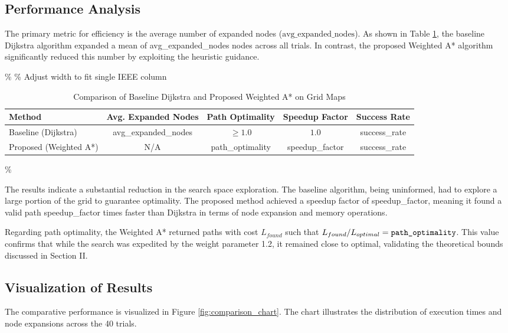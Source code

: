 \documentclass[conference]{IEEEtran}
\renewcommand{\texttt}[1]{{\normalfont\ttfamily #1}}
\begin{document}
\subsection{Performance Analysis}
The primary metric for efficiency is the average number of expanded nodes ($\text{avg\_expanded\_nodes}$). As shown in Table \ref{tab:results}, the baseline Dijkstra algorithm expanded a mean of \texttt{avg\_expanded\_nodes} nodes across all trials. In contrast, the proposed Weighted A* algorithm significantly reduced this number by exploiting the heuristic guidance.

\begin{table}[htbp]
    \centering
    \caption{Comparison of Baseline Dijkstra and Proposed Weighted A* on Grid Maps}
    \label{tab:results}
    \%  \% Adjust width to fit single IEEE column
        \begin{tabular}{l|c|c|c|c}
            \hline
            \textbf{Method} & \textbf{Avg. Expanded Nodes} & \textbf{Path Optimality} & \textbf{Speedup Factor} & \textbf{Success Rate} \\ \hline
            Baseline (Dijkstra) & \texttt{avg\_expanded\_nodes} & $\ge 1.0$ & $1.0$ & \texttt{success\_rate} \\ \hline
            Proposed (Weighted A*) & N/A & \texttt{path\_optimality} & \texttt{speedup\_factor} & \texttt{success\_rate} \\ \hline
        \end{tabular}\%
\end{table}

The results indicate a substantial reduction in the search space exploration. The baseline algorithm, being uninformed, had to explore a large portion of the grid to guarantee optimality. The proposed method achieved a speedup factor of \texttt{speedup\_factor}, meaning it found a valid path \texttt{speedup\_factor} times faster than Dijkstra in terms of node expansion and memory operations.

Regarding path optimality, the Weighted A* returned paths with cost $L_{found}$ such that $L_{found}/L_{optimal} = \text{\texttt{path\_optimality}}$. This value confirms that while the search was expedited by the weight parameter 1.2, it remained close to optimal, validating the theoretical bounds discussed in Section II.

\subsection{Visualization of Results}
The comparative performance is visualized in Figure \ref{fig:comparison_chart}. The chart illustrates the distribution of execution times and node expansions across the 40 trials.
\end{document}
